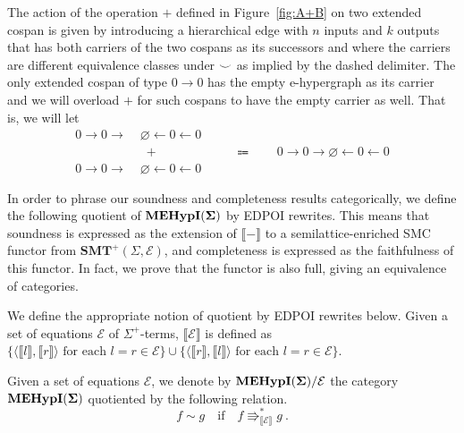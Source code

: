 \begin{remark}
\label{remark:f+g}
The action of the operation $+$ defined in Figure~\ref{fig:A+B} on two extended cospan is given by introducing a hierarchical edge with $n$ inputs and $k$ outputs that has both carriers of the two cospans as its successors and where the carriers are different equivalence classes under ${\smile}$ as implied by the dashed delimiter.
The only extended cospan of type $0 \to 0$ has the empty e-hypergraph as its carrier and we will overload $+$ for such cospans to have the empty carrier as well.
That is, we will let 
\begin{align*}
	0 \to 0 \to \;&\varnothing \xleftarrow{} 0 \xleftarrow{} 0\\
	&\;+ \hspace{6em} \Coloneqq \hspace{2em} 0 \to 0 \to \varnothing \xleftarrow{} 0 \xleftarrow{} 0\\
	0 \to 0 \to \;&\varnothing \xleftarrow{} 0 \xleftarrow{} 0
\end{align*}
\end{remark}

In order to phrase our soundness and completeness results categorically,  we define the following quotient of ${\mathbf{MEHypI(\Sigma)}}$ by EDPOI rewrites.  This means that soundness is expressed as the extension of $\llbracket - \rrbracket$ to a semilattice-enriched SMC functor from $\textbf{SMT}^+(\Sigma, \mathcal E)$,  and completeness is expressed as the faithfulness of this functor.  In fact,  we prove that the functor is also full,  giving an equivalence of categories. 

We define the appropriate notion of quotient by EDPOI rewrites below.  
Given a set of equations $\mathcal{E}$ of $\Sigma^{+}$-terms, $\llbracket \mathcal{E} \rrbracket$ is defined as $\{\langle \llbracket l \rrbracket, \llbracket r \rrbracket \rangle \text{ for each } l = r \in \mathcal{E} \} \cup \{\langle \llbracket r \rrbracket, \llbracket l \rrbracket \rangle \text{ for each } l = r \in \mathcal{E}\}$.
\begin{definition}  
Given a set of equations $\mathcal{E}$,  we denote by ${\mathbf{MEHypI(\Sigma)}}/\mathcal{E}$ the category ${\mathbf{MEHypI(\Sigma)}}$ quotiented by the following relation. 
\[
	f \sim g \quad \text{if} \quad f \Rrightarrow^{*}_{\llbracket \mathcal E \rrbracket} g ~ . 
\]
\end{definition}


